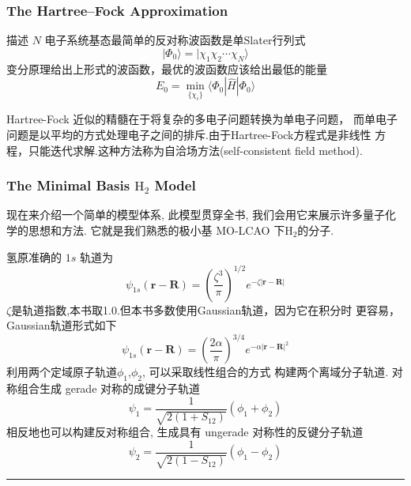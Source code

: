 \documentclass[fontset=none,12pt,a4paper]{ctexart}
\numberwithin{equation}{section}
\begin{document}
\subsubsection{The Hartree--Fock Approximation}
描述 $N$ 电子系统基态最简单的反对称波函数是单Slater行列式
\begin{equation}
  |\Phi_0\rangle = |\chi_1 \chi_2 \cdots \chi_N \rangle   
\end{equation}
变分原理给出上形式的波函数，最优的波函数应该给出最低的能量
\begin{equation}
  E_0 = \min_{\{\chi_i\}} \langle \Phi_0 | \hat{H} | \Phi_0 \rangle
\end{equation}

Hartree-Fock 近似的精髓在于将复杂的多电子问题转换为单电子问题，
而单电子问题是以平均的方式处理电子之间的排斥.由于Hartree-Fock方程式是非线性
方程，只能迭代求解.这种方法称为自洽场方法(self-consistent field method).
\subsubsection{The Minimal Basis \texorpdfstring{$\mathrm{H}_2$}{H2} Model}       
现在来介绍一个简单的模型体系, 此模型贯穿全书, 我们会用它来展示许多量子化
学的思想和方法. 它就是我们熟悉的极小基 MO-LCAO 下$\mathrm{H}_2$的分子.

氢原准确的 $1s$ 轨道为
\begin{equation}
  \psi_{1s}(\mathbf{r}-\mathbf{R}) = 
  \left( \frac{\zeta^3}{\pi} \right)^{1/2} e^{-\zeta |\mathbf{r}-\mathbf{R}|}
\end{equation}
$\zeta$是轨道指数,本书取1.0.但本书多数使用Gaussian轨道，因为它在积分时
更容易，Gaussian轨道形式如下
\begin{equation}
  \psi_{1s}(\mathbf{r}-\mathbf{R}) = 
  \left(\frac{2\alpha}{\pi}\right)^{3/4} e^{-\alpha |\mathbf{r}-\mathbf{R}|^2}
\end{equation}
利用两个定域原子轨道$\phi_1$,$\phi_2$, 可以采取线性组合的方式
构建两个离域分子轨道. 对称组合生成 gerade 对称的成键分子轨道 
\begin{equation}
  \psi_1 = \frac{1}{\sqrt{2(1+S_{12})}} (\phi_1 + \phi_2)
\end{equation}
相反地也可以构建反对称组合, 生成具有 ungerade 对称性的反键分子轨道
\begin{equation}
  \psi_2 = \frac{1}{\sqrt{2(1-S_{12})}} (\phi_1 - \phi_2)
\end{equation}

\vspace{1em}
\noindent\rule{\linewidth}{0.4pt}
\end{document}
